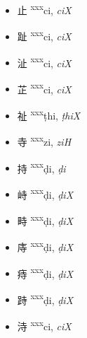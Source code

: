 \begin{itemize}

    \item {\Large{止}} %
    {\large{{\textsuperscript{xxx}}ci}},
    \textit{ciX}             %

    \item {\Large{趾}} %
    {\large{{\textsuperscript{xxx}}ci}},
    \textit{ciX}             %

    \item {\Large{沚}} %
    {\large{{\textsuperscript{xxx}}ci}},
    \textit{ciX}             %

    \item {\Large{芷}} %
    {\large{{\textsuperscript{xxx}}ci}},
    \textit{ciX}             %

    \item {\Large{祉}} %
    {\large{{\textsuperscript{xxx}}ṭhi}},
    \textit{ṭhiX}            %

    \item {\Large{寺}} %
    {\large{{\textsuperscript{xxx}}zi}},
    \textit{ziH}             %

    \item {\Large{持}} %
    {\large{{\textsuperscript{xxx}}ḍi}},
    \textit{ḍi}              %

    \item {\Large{峙}} %
    {\large{{\textsuperscript{xxx}}ḍi}},
    \textit{ḍiX}             %

    \item {\Large{畤}} %
    {\large{{\textsuperscript{xxx}}ḍi}},
    \textit{ḍiX}             %

    \item {\Large{庤}} %
    {\large{{\textsuperscript{xxx}}ḍi}},
    \textit{ḍiX}             %

    \item {\Large{痔}} %
    {\large{{\textsuperscript{xxx}}ḍi}},
    \textit{ḍiX}             %

    \item {\Large{跱}} %
    {\large{{\textsuperscript{xxx}}ḍi}},
    \textit{ḍiX}             %

    \item {\Large{洔}} %
    {\large{{\textsuperscript{xxx}}ci}},
    \textit{ciX}             %


\end{itemize}
